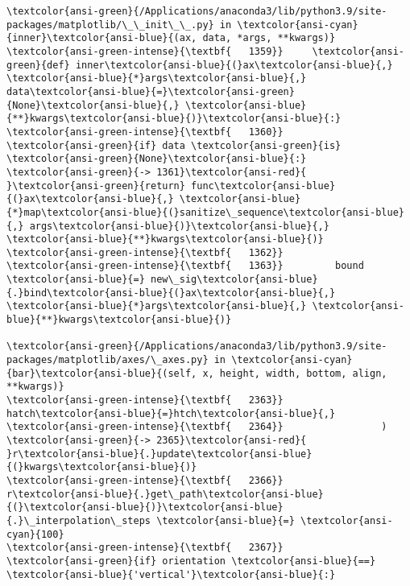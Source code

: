 \documentclass[11pt]{article}
\begin{document}
\begin{Verbatim}[commandchars=\\\{\}, frame=single, framerule=2mm, rulecolor=\color{outerrorbackground}]
\textcolor{ansi-green}{/Applications/anaconda3/lib/python3.9/site-packages/matplotlib/\_\_init\_\_.py} in \textcolor{ansi-cyan}{inner}\textcolor{ansi-blue}{(ax, data, *args, **kwargs)}
\textcolor{ansi-green-intense}{\textbf{   1359}}     \textcolor{ansi-green}{def} inner\textcolor{ansi-blue}{(}ax\textcolor{ansi-blue}{,} \textcolor{ansi-blue}{*}args\textcolor{ansi-blue}{,} data\textcolor{ansi-blue}{=}\textcolor{ansi-green}{None}\textcolor{ansi-blue}{,} \textcolor{ansi-blue}{**}kwargs\textcolor{ansi-blue}{)}\textcolor{ansi-blue}{:}
\textcolor{ansi-green-intense}{\textbf{   1360}}         \textcolor{ansi-green}{if} data \textcolor{ansi-green}{is} \textcolor{ansi-green}{None}\textcolor{ansi-blue}{:}
\textcolor{ansi-green}{-> 1361}\textcolor{ansi-red}{             }\textcolor{ansi-green}{return} func\textcolor{ansi-blue}{(}ax\textcolor{ansi-blue}{,} \textcolor{ansi-blue}{*}map\textcolor{ansi-blue}{(}sanitize\_sequence\textcolor{ansi-blue}{,} args\textcolor{ansi-blue}{)}\textcolor{ansi-blue}{,} \textcolor{ansi-blue}{**}kwargs\textcolor{ansi-blue}{)}
\textcolor{ansi-green-intense}{\textbf{   1362}} 
\textcolor{ansi-green-intense}{\textbf{   1363}}         bound \textcolor{ansi-blue}{=} new\_sig\textcolor{ansi-blue}{.}bind\textcolor{ansi-blue}{(}ax\textcolor{ansi-blue}{,} \textcolor{ansi-blue}{*}args\textcolor{ansi-blue}{,} \textcolor{ansi-blue}{**}kwargs\textcolor{ansi-blue}{)}

\textcolor{ansi-green}{/Applications/anaconda3/lib/python3.9/site-packages/matplotlib/axes/\_axes.py} in \textcolor{ansi-cyan}{bar}\textcolor{ansi-blue}{(self, x, height, width, bottom, align, **kwargs)}
\textcolor{ansi-green-intense}{\textbf{   2363}}                 hatch\textcolor{ansi-blue}{=}htch\textcolor{ansi-blue}{,}
\textcolor{ansi-green-intense}{\textbf{   2364}}                 )
\textcolor{ansi-green}{-> 2365}\textcolor{ansi-red}{             }r\textcolor{ansi-blue}{.}update\textcolor{ansi-blue}{(}kwargs\textcolor{ansi-blue}{)}
\textcolor{ansi-green-intense}{\textbf{   2366}}             r\textcolor{ansi-blue}{.}get\_path\textcolor{ansi-blue}{(}\textcolor{ansi-blue}{)}\textcolor{ansi-blue}{.}\_interpolation\_steps \textcolor{ansi-blue}{=} \textcolor{ansi-cyan}{100}
\textcolor{ansi-green-intense}{\textbf{   2367}}             \textcolor{ansi-green}{if} orientation \textcolor{ansi-blue}{==} \textcolor{ansi-blue}{'vertical'}\textcolor{ansi-blue}{:}


\end{Verbatim}
\end{document}
